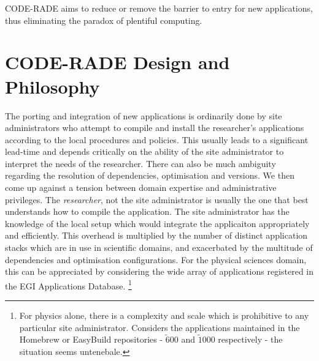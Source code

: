 \documentclass[a4paper]{jpconf}
\begin{document}
    CODE-RADE aims to reduce or remove the barrier to entry for new applications, thus eliminating
    the paradox of plentiful computing.

	\section{CODE-RADE Design and Philosophy}

    The porting and integration of new applications is ordinarily done by site administrators who
    attempt to compile and install the researcher's applications according to the local procedures and
    policies. This usually leads to a significant lead-time and depends critically on the
    ability of the site administrator to interpret the needs of the researcher. There
    can also be much ambiguity regarding the resolution of dependencies, optimisation and versions. We
    then come up against a tension between domain expertise and administrative privileges. The 
    {\it researcher}, not the site administrator is usually the one that best understands how to compile the
    application. The site administrator has the knowledge of the local setup
    which would integrate the applicaiton appropriately and efficiently. 
    This overhead is multiplied by the number of distinct application stacks which
    are in use in scientific domains, and exacerbated by the multitude of dependencies and
    optimisation configurations. For the physical sciences domain, this can be appreciated by
    considering the wide array of applications registered in the EGI Applications
    Database\cite{EGIAppDB}. \footnote{For physics alone,
    there is a complexity and scale which is prohibitive to any particular site administrator.
    Considers the applications maintained in the Homebrew or EasyBuild repositories -
    $\tilde 600$ and $\tilde 1000$ respectively - the situation seems untenebale.}

\end{document}
